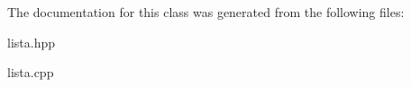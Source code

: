 The documentation for this class was generated from the following files\+:\begin{DoxyCompactItemize}
\item 
lista.\+hpp\item 
lista.\+cpp\end{DoxyCompactItemize}
